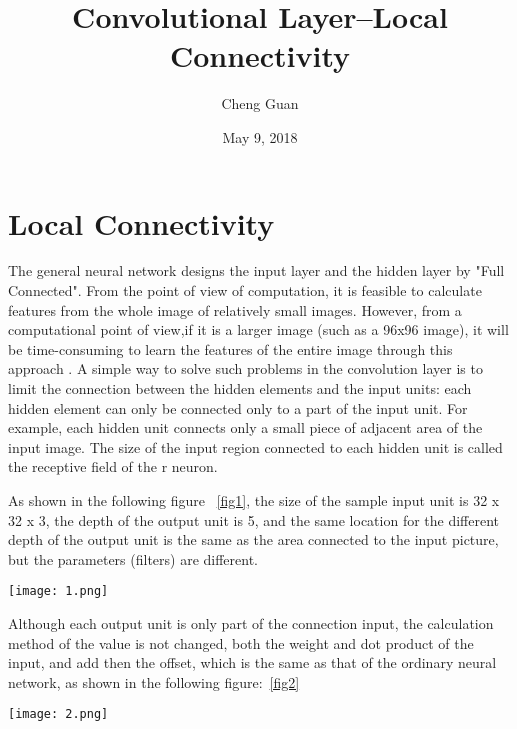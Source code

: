 \documentclass[12pt,twocolumn]{article}
\begin{document}
\title{Convolutional Layer--Local Connectivity}
\author{Cheng Guan}
\date{May 9, 2018}
\maketitle
\setlength{\baselineskip}{20pt}
\section{Local Connectivity}

  The general neural network designs the input layer and the hidden layer
  by "Full Connected". From the point of view of computation,
  it is feasible to calculate features from the whole image of relatively small images.
  However, from a computational point of view,if it is a larger image (such as a 96x96 image),
  it will be time-consuming to learn the features of the entire image through this approach .
  A simple way to solve such problems in the convolution layer is to limit the connection
  between the hidden elements and the input units: each hidden element can only be connected only to a part of the input unit.
  For example, each hidden unit connects only a small piece of adjacent area of the input image.
  The size of the input region connected to each hidden unit is called the receptive field of the r neuron.

  As shown in the following figure ~\ref{fig1}, the size of the sample input unit is 32 x 32 x 3,
  the depth of the output unit is 5, and the same location for the different depth of the output unit is the same as the area connected to the input picture,
  but the parameters (filters) are different. \cite{test2}

  \begin{figure*}[tp]
  \centering
  \texttt{[image: 1.png]}\\
  \caption{Local Connectivity}
  \label{fig1}
 \end{figure*}

 Although each output unit is only part of the connection input,
 the calculation method of the value is not changed, both the weight and dot product of the input,
 and add then the offset, which is the same as that of the ordinary neural network, as shown in the following figure:~\ref{fig2}

   \begin{figure*}[tp]
   \centering
   \texttt{[image: 2.png]}\\
   \caption{Method Of Calculating}
   \label{fig2}
  \end{figure*}
\twocolumn


\end{document}
